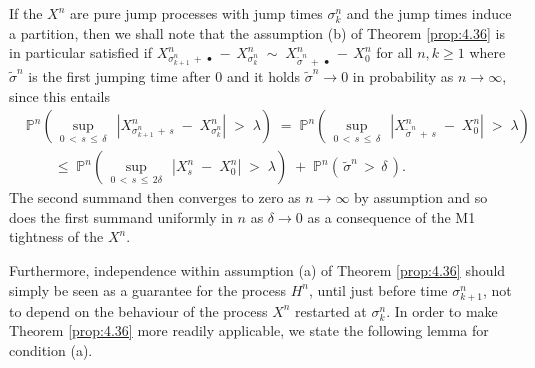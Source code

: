 \documentclass[11pt]{article}
\theoremstyle{definition}\newtheorem{example}[theorem]{Example}
\theoremstyle{definition}\newtheorem{counterexample}[theorem]{Counterexample}
\theoremstyle{definition}\newtheorem{remark}[theorem]{Remark}
\theoremstyle{definition}\newtheorem{defi}[theorem]{Definition}
\numberwithin{equation}{section}
\newcommand{\Pro}{\mathbb{P}}										%
\renewcommand{\sup}[1]{\underset{#1}{\operatorname{sup}}\;}					%
\renewcommand{\|}{\; : \, \;}											%
\begin{document}
If the $X^n$ are pure jump processes with jump times $\sigma^n_k$ and the jump times induce a partition, then we shall note that the assumption (b) of Theorem \ref{prop:4.36} is in particular satisfied if $X^n_{\sigma^{n}_{k+1}\, +\, \bullet} \, - \, X^n_{\sigma^{n}_k} \; \sim \; X^n_{\tilde \sigma^{n}\, +\,
	\bullet} \, - \, X^n_0$ for all $n,k\ge 1$ where $\tilde{\sigma}^n$ is the first jumping time after $0$ and it holds $\tilde \sigma^{n} \to 0$ in probability as $n\to \infty$, since this entails
\begin{align*}
	&\Pro^n\left(\, \sup{0\, < \, s \, \le \, \delta} \, |X^n_{\sigma^{n}_{k+1}\, +\, s} \; - \; X^n_{\sigma^{n}_k}| \; > \; \lambda \right) \; = \; \Pro^n\left(\, \sup{0\, < \, s \, \le \, \delta} \, |X^n_{\tilde \sigma^{n}\, +\, s} \; - \; X^n_{0}| \; > \; \lambda \right)\\
	&\qquad \le \; \Pro^n\left(\, \sup{0\, < \, s \, \le \, 2\delta} \, |X^n_{ s} \; - \; X^n_{0}| \; > \; \lambda \right) \; + \; \Pro^n\left(\, \tilde \sigma^{n}\, > \, \delta \,\right).
\end{align*}
The second summand then converges to zero as $n\to \infty$ by assumption and so does the first summand uniformly in $n$ as $\delta \to 0$ as a consequence of the M1 tightness of the $X^n$.

Furthermore, independence within assumption (a) of Theorem \ref{prop:4.36} should simply be seen as a guarantee for the process $H^n$, until just before time $\sigma^n_{k+1}$, not to depend on the behaviour of the process $X^n$ restarted at $\sigma^n_k$. In order to make Theorem \ref{prop:4.36} more readily applicable, we state the following lemma for condition (a).
\end{document}
